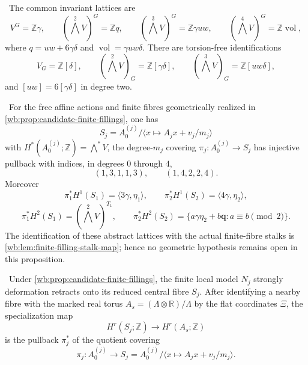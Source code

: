 
\begin{theorem}\label{wb:thm:coinvariants}
\ The common invariant lattices are
\[
 V^G=\mathbb Z\gamma,\qquad
 (\textstyle\bigwedge^2V)^G=\mathbb Zq,\qquad
 (\textstyle\bigwedge^3V)^G=\mathbb Z\gamma uw,\qquad
 (\textstyle\bigwedge^4V)^G=\mathbb Z\operatorname{vol},
\]
where $q=uw+6\gamma\delta$ and
$\operatorname{vol}=\gamma uw\delta$.  There are torsion-free
identifications
\[
V_G=\mathbb Z[\delta],\qquad
(\textstyle\bigwedge^2V)_G=\mathbb Z[\gamma\delta],
\qquad
(\textstyle\bigwedge^3V)_G=\mathbb Z[uw\delta],
\tag{3.5}
\]
and $[uw]=6[\gamma\delta]$ in degree two.
\end{theorem}

\begin{proposition}
\label{wb:prop:finite-indices}
\ For the free affine actions and finite fibres geometrically
realized in \cref{wb:prop:candidate-finite-fillings}, one has
\[
S_j=A_0^{(j)}/\langle x\mapsto A_jx+v_j/m_j\rangle
\]
with $H^*(A_0^{(j)};\mathbb Z)=\bigwedge^*V$, the
degree-$m_j$ covering $\pi_j:A_0^{(j)}\to S_j$ has injective pullback with
indices, in degrees $0$ through $4$,
\[
(1,3,1,1,3),\qquad (1,4,2,2,4).
\tag{3.7}
\]
Moreover
\[
\pi_1^*H^1(S_1)=\langle3\gamma,\eta_1\rangle,\qquad
\pi_2^*H^1(S_2)=\langle4\gamma,\eta_2\rangle,
\]
\[
\pi_1^*H^2(S_1)=(\textstyle\bigwedge^2V)^{T_1},\qquad
\pi_2^*H^2(S_2)
=\{a\gamma\eta_2+b\mathbf q:a\equiv b\pmod2\}.
\tag{3.8}
\]
The identification of these abstract lattices with the actual finite-fibre
stalks is \cref{wb:lem:finite-filling-stalk-map}; hence no geometric hypothesis
remains open in this proposition.
\end{proposition}

\begin{lemma}
\label{wb:lem:finite-filling-stalk-map}
\ Under \cref{wb:prop:candidate-finite-fillings}, the finite local
model \(N_j\) strongly deformation retracts onto its reduced central fibre
\(S_j\).  After identifying a nearby fibre with the marked real torus
\(A_s=(\Lambda\otimes\mathbb R)/\Lambda\) by the flat coordinates
\(\Xi\), the specialization map
\[
 H^r(S_j;\mathbb Z)\longrightarrow H^r(A_s;\mathbb Z)
\]
is the pullback \(\pi_j^*\) of the quotient covering
\[
 \pi_j:A_0^{(j)}\longrightarrow
 S_j=A_0^{(j)}/\langle x\mapsto A_jx+v_j/m_j\rangle .
\]
\end{lemma}

